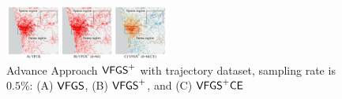 \begin{figure}[t]
	\centering
	\includegraphics[width=0.48\textwidth]{pictures/problemsolveing/delta_motivation.pdf}
	\vspace{-3mm}
	\caption{Advance Approach $\mathsf{VFGS}^{+}$ with \pt{} trajectory dataset, sampling rate is $0.5\%$: (A) $\mathsf{VFGS}{}$, (B) $\mathsf{VFGS}^{+}$, and (C) $\mathsf{VFGS}^{+}\mathsf{CE}$}
	\label{fig:delta}
	 \vspace{-3mm}
\end{figure}




